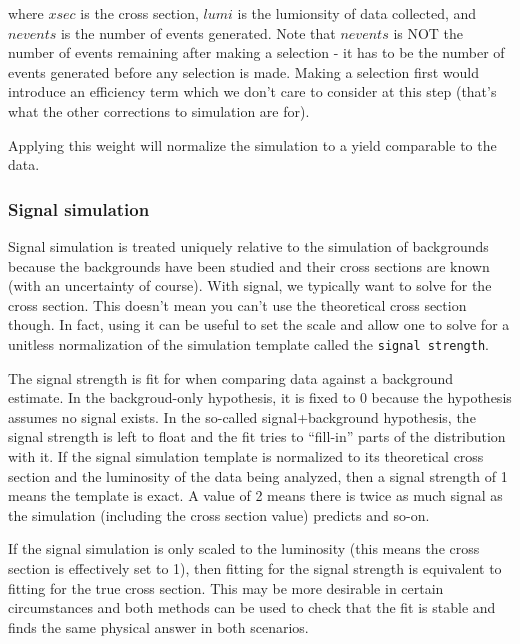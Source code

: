 where $xsec$ is the cross section, $lumi$ is the lumionsity of data collected, and $nevents$ is the number of events generated. Note that $nevents$ is NOT the number of events remaining after making a selection - it has to be the number of events generated before any selection is made. Making a selection first would introduce an efficiency term which we don't care to consider at this step (that's what the other corrections to simulation are for).

Applying this weight will normalize the simulation to a yield comparable to the data.

\subsubsection{Signal simulation}
Signal simulation is treated uniquely relative to the simulation of backgrounds because the backgrounds have been studied and their cross sections are known (with an uncertainty of course). With signal, we typically want to solve for the cross section. This doesn't mean you can't use the theoretical cross section though. In fact, using it can be useful to set the scale and allow one to solve for a unitless normalization of the simulation template called the \verb"signal strength".

The signal strength is fit for when comparing data against a background estimate. In the backgroud-only hypothesis, it is fixed to 0 because the hypothesis assumes no signal exists. In the so-called signal+background hypothesis, the signal strength is left to float and the fit tries to ``fill-in'' parts of the distribution with it. If the signal simulation template is normalized to its theoretical cross section and the luminosity of the data being analyzed, then a signal strength of 1 means the template is exact. A value of 2 means there is twice as much signal as the simulation (including the cross section value) predicts and so-on. 

If the signal simulation is only scaled to the luminosity (this means the cross section is effectively set to 1), then fitting for the signal strength is equivalent to fitting for the true cross section. This may be more desirable in certain circumstances and both methods can be used to check that the fit is stable and finds the same physical answer in both scenarios.

